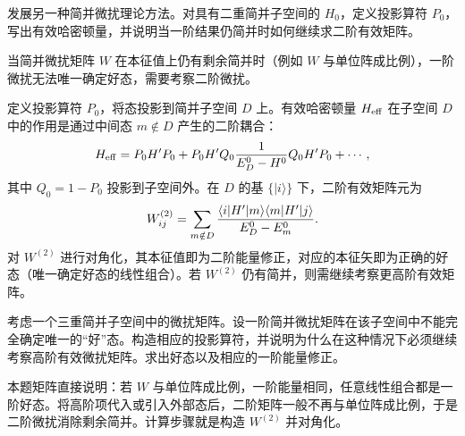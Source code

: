 \begin{question}
发展另一种简并微扰理论方法。对具有二重简并子空间的 $H_0$，定义投影算符 $P_0$，写出有效哈密顿量，并说明当一阶结果仍简并时如何继续求二阶有效矩阵。
\end{question}
\begin{solution}
当简并微扰矩阵 $W$ 在本征值上仍有剩余简并时（例如 $W$ 与单位阵成比例），一阶微扰无法唯一确定好态，需要考察二阶微扰。

定义投影算符 $P_0$，将态投影到简并子空间 $D$ 上。有效哈密顿量 $H_{\rm eff}$ 在子空间 $D$ 中的作用是通过中间态 $m\notin D$ 产生的二阶耦合：
\[
H_{\rm eff} = P_0 H' P_0 + P_0 H' Q_0 {1\over E_D^0-H^0} Q_0 H' P_0 + \cdots,
\]
其中 $Q_0=1-P_0$ 投影到子空间外。在 $D$ 的基 $\{|i\rangle\}$ 下，二阶有效矩阵元为
\[
W^{(2)}_{ij} = \sum_{m\notin D} {\langle i|H'|m\rangle\langle m|H'|j\rangle\over E_D^0 - E_m^0}.
\]
对 $W^{(2)}$ 进行对角化，其本征值即为二阶能量修正，对应的本征矢即为正确的好态（唯一确定好态的线性组合）。若 $W^{(2)}$ 仍有简并，则需继续考察更高阶有效矩阵。
\end{solution}

\begin{question}
考虑一个三重简并子空间中的微扰矩阵。设一阶简并微扰矩阵在该子空间中不能完全确定唯一的“好”态。构造相应的投影算符，并说明为什么在这种情况下必须继续考察高阶有效微扰矩阵。求出好态以及相应的一阶能量修正。
\end{question}
\begin{solution}
本题矩阵直接说明：若 $W$ 与单位阵成比例，一阶能量相同，任意线性组合都是一阶好态。将高阶项代入或引入外部态后，二阶矩阵一般不再与单位阵成比例，于是二阶微扰消除剩余简并。计算步骤就是构造 $W^{(2)}$ 并对角化。
\end{solution}


